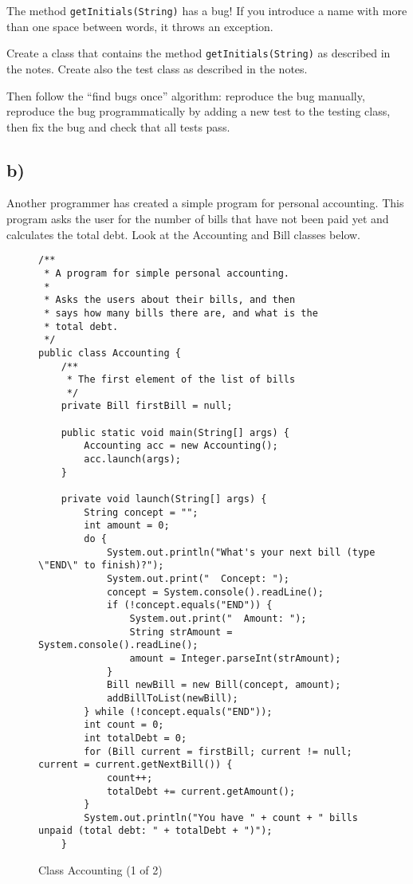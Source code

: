 \documentclass{article}
\begin{document}
The method \verb+getInitials(String)+ has a bug! If you introduce a
name with more than one space between words, it throws an exception.

Create a class that contains the method \verb+getInitials(String)+ as
described in the notes. Create also the test class as described in the
notes. 

Then follow the ``find bugs once'' algorithm: reproduce the bug manually,
reproduce the bug programmatically by adding a new test to the testing
class, then fix the bug and check that all tests pass. 

\subsection*{b)}
\label{sec:b}

Another programmer has created a simple program for personal
accounting. This program asks the user for the number of bills that have not
been paid yet and calculates the total debt. Look at the Accounting
and Bill classes below. 

\begin{figure}[hbtp]
  \centering
\begin{verbatim}
/**
 * A program for simple personal accounting. 
 *
 * Asks the users about their bills, and then 
 * says how many bills there are, and what is the
 * total debt.
 */
public class Accounting {
    /**
     * The first element of the list of bills
     */
    private Bill firstBill = null;

    public static void main(String[] args) {
        Accounting acc = new Accounting();
        acc.launch(args);
    }

    private void launch(String[] args) {
        String concept = "";
        int amount = 0;
        do {
            System.out.println("What's your next bill (type \"END\" to finish)?");
            System.out.print("  Concept: "); 
            concept = System.console().readLine();
            if (!concept.equals("END")) {
                System.out.print("  Amount: "); 
                String strAmount = System.console().readLine();
                amount = Integer.parseInt(strAmount);
            }
            Bill newBill = new Bill(concept, amount);
            addBillToList(newBill);
        } while (!concept.equals("END"));
        int count = 0;
        int totalDebt = 0;
        for (Bill current = firstBill; current != null; current = current.getNextBill()) {
            count++;
            totalDebt += current.getAmount();
        }
        System.out.println("You have " + count + " bills unpaid (total debt: " + totalDebt + ")");
    }
\end{verbatim}
  \caption{Class Accounting (1 of 2)}
  \label{fig:accountingggggt}
\end{figure}
\end{document}

